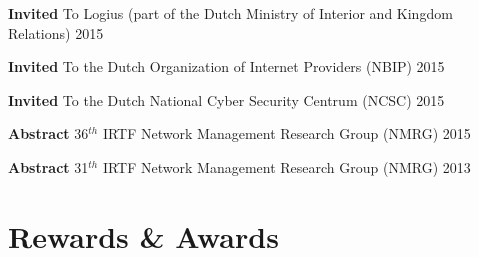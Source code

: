 \documentclass[print]{styles/friggeri-cv-mac} %
\begin{document}
\begin{entrylist}

\vspace{-0.3cm}
\entry
{\textbf{Invited}}
{\textnormal{To Logius (part of the Dutch Ministry of Interior and Kingdom Relations)}}
{2015}

\vspace{-0.3cm}
\entry
{\textbf{Invited}}
{\textnormal{To the Dutch Organization of Internet Providers (NBIP)}}
{2015}

\vspace{-0.3cm}
\entry
{\textbf{Invited}}
{\textnormal{To the Dutch National Cyber Security Centrum (NCSC)}}
{2015}

\vspace{-0.3cm}
\entry
{\textbf{Abstract}}
{\textnormal{36$^{th}$ IRTF Network Management Research Group (NMRG)}}
{2015}

\vspace{-0.3cm}
\entry
{\textbf{Abstract}}
{\textnormal{31$^{th}$ IRTF Network Management Research Group (NMRG)}}
{2013}


\end{entrylist}

\newpage
\section{Rewards \& Awards}\vspace{-5pt}
\end{document}
